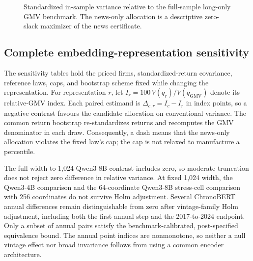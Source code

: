 \begin{figure}[H]
  \centering
  \caption{Standardized in-sample variance relative to the full-sample
    long-only GMV benchmark. The news-only allocation is a descriptive
  zero-slack maximizer of the news certificate.}
  \label{fig:news-variance-benchmark}
\end{figure}

\subsection{Complete embedding-representation sensitivity}
\label{sec:p3-representation-ablation}

The sensitivity tables hold the priced firms, standardized-return covariance,
reference laws, caps, and bootstrap scheme fixed while changing the
representation.
For representation $r$, let
$I_r=100\,V(q_r)/V(q_{\mathrm{GMV}})$ denote its relative-GMV index.
Each paired estimand is $\Delta_{c,r}=I_c-I_r$ in index points, so a negative
contrast favours the candidate allocation on conventional variance.
The common return bootstrap re-standardizes returns and recomputes the GMV
denominator in each draw.
Consequently, a dash means that the news-only allocation violates the fixed
law's cap; the cap is not relaxed to manufacture a percentile.



The full-width-to-1,024 Qwen3-8B contrast includes zero, so moderate truncation
does not reject zero difference in relative variance.
At fixed 1,024 width, the Qwen3-4B comparison and the 64-coordinate
Qwen3-8B stress-cell comparison with 256 coordinates do not survive Holm
adjustment.
Several ChronoBERT annual differences remain distinguishable from zero after
vintage-family Holm adjustment, including both the first annual step and the
2017-to-2024 endpoint.
Only a subset of annual pairs satisfy the benchmark-calibrated,
post-specified equivalence bound.
The annual point indices are nonmonotone, so neither a null vintage effect nor
broad invariance follows from using a common encoder architecture.

